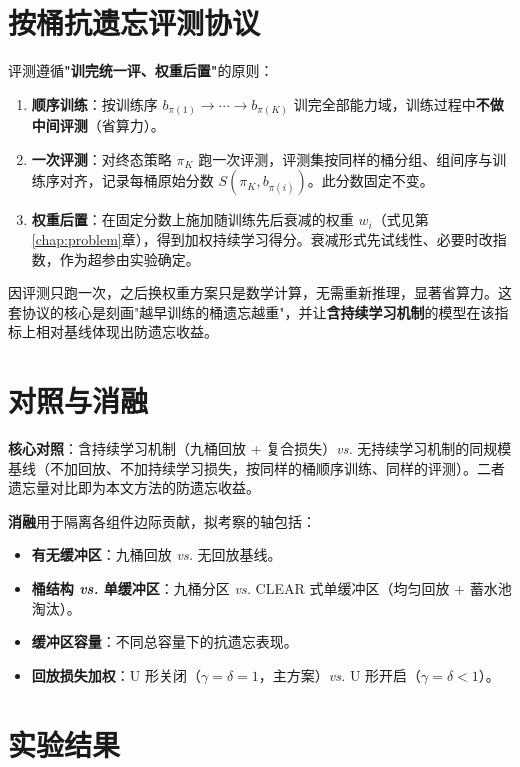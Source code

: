 \section{按桶抗遗忘评测协议}
\label{sec:exp-eval}

评测遵循\textbf{"训完统一评、权重后置"}的原则：

\begin{enumerate}
  \item \textbf{顺序训练}：按训练序 $b_{\pi(1)}\to\cdots\to b_{\pi(K)}$ 训完全部能力域，训练过程中\textbf{不做中间评测}（省算力）。
  \item \textbf{一次评测}：对终态策略 $\pi_K$ 跑一次评测，评测集按同样的桶分组、组间序与训练序对齐，记录每桶原始分数 $S(\pi_K, b_{\pi(i)})$。此分数固定不变。
  \item \textbf{权重后置}：在固定分数上施加随训练先后衰减的权重 $w_i$（式见第\ref{chap:problem}章），得到加权持续学习得分。衰减形式先试线性、必要时改指数，作为超参由实验确定。
\end{enumerate}

因评测只跑一次，之后换权重方案只是数学计算，无需重新推理，显著省算力。这套协议的核心是刻画"越早训练的桶遗忘越重"，并让\textbf{含持续学习机制}的模型在该指标上相对基线体现出防遗忘收益。

\section{对照与消融}
\label{sec:exp-ablation}

\textbf{核心对照}：含持续学习机制（九桶回放 + 复合损失）\emph{vs.} 无持续学习机制的同规模基线（不加回放、不加持续学习损失，按同样的桶顺序训练、同样的评测）。二者遗忘量对比即为本文方法的防遗忘收益。

\textbf{消融}用于隔离各组件边际贡献，拟考察的轴包括：

\begin{itemize}
  \item \textbf{有无缓冲区}：九桶回放 \emph{vs.} 无回放基线。
  \item \textbf{桶结构 \emph{vs.} 单缓冲区}：九桶分区 \emph{vs.} CLEAR 式单缓冲区（均匀回放 + 蓄水池淘汰）。
  \item \textbf{缓冲区容量}：不同总容量下的抗遗忘表现。
  \item \textbf{回放损失加权}：U 形关闭（$\gamma=\delta=1$，主方案）\emph{vs.} U 形开启（$\gamma=\delta<1$）。
\end{itemize}

\section{实验结果}

